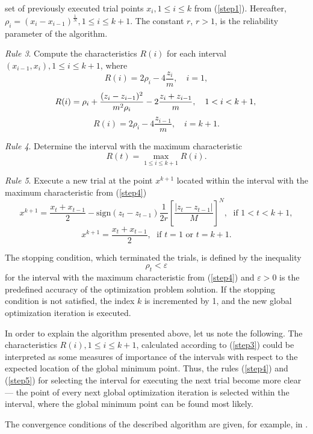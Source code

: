 \documentclass{aims}
\theoremstyle{definition}
\begin{document}
set of previously executed trial points \(x_i,1\leq i\leq k\) from (\ref{step1}).
Hereafter, \(\rho_i=(x_i-x_{i-1})^\frac{1}{N},1\leq i\leq k+1\). The
constant \(r\), \(r>1\), is the reliability parameter of the algorithm.
\par
\textit{Rule 3}. Compute the characteristics \(R(i)\) for each interval \((x_{i-1},x_i),1\leq i\leq k+1\), where
\[
R(i)=2\rho_i-4\frac{z_i}{m},\quad i=1,
\]
\begin{equation} \label{step3}
R(i)=\rho_i+\frac{(z_i-z_{i-1})^2}{m^2\rho_i}-2\frac{z_i+z_{i-1}}{m},\quad 1<i<k+1, \\
\end{equation}
\[
R(i)=2\rho_{i}-4\frac{z_{i-1}}{m},\quad i=k+1.
\]

\par
\textit{Rule 4}. Determine the interval with the maximum characteristic
\begin{equation} \label{step4}
R(t)=\max_{1\leq i \leq k+1}R(i).
\end{equation}
\par
\textit{Rule 5}. Execute a new trial at the point \(x^{k+1}\) located within the interval
with the maximum characteristic from (\ref{step4})
\begin{equation} \label{step5}
  x^{k+1}=\frac{x_t+x_{t-1}}{2}-\mathrm{sign}(z_{t}-z_{t-1})\frac{1}{2r}\left[\frac{|z_{t}-z_{t-1}|}{M}\right]^N,\; \textrm{ if } 1<t<k+1,
\end{equation}
\[
  x^{k+1}=\frac{x_t+x_{t-1}}{2},\; \textrm{ if } t=1 \textrm{ or } t=k+1.
\]

\par
The stopping condition, which terminated the trials, is defined by the inequality
\begin{equation}
  \label{eq:stop_1}
\rho_t<\varepsilon
\end{equation}
for the interval with the maximum characteristic from (\ref{step4}) and \(\varepsilon >0\) is the predefined
accuracy of the optimization problem solution. If the stopping condition is not satisfied,
the index \(k\) is incremented by 1, and the new global optimization iteration is executed.
\par
In order to explain the algorithm presented above, let us note the following.
The characteristics \(R(i), 1\leq i\leq k+1\), calculated according to (\ref{step3}) could
be interpreted as some measures of importance of the intervals with respect to the
expected location of the global minimum point. Thus, the rules (\ref{step4}) and (\ref{step5}) for selecting
the interval for executing the next trial become more clear --- the point of every next
global optimization iteration is selected within the interval, where the global minimum
point can be found most likely.
\par
The convergence conditions of the described algorithm are given, for example, in \cite{strSergGO}.
\end{document}
